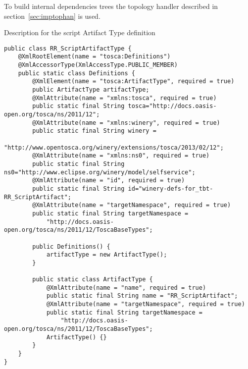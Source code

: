 To build internal dependencies trees the topology handler described in section~\ref{sec:imptophan} is used. 
\begin{Listing} 
	\caption{Description for the script Artifact Type definition}
	\label{lst:scripttype}
\begin{lstlisting}
public class RR_ScriptArtifactType {
	@XmlRootElement(name = "tosca:Definitions")
	@XmlAccessorType(XmlAccessType.PUBLIC_MEMBER)
	public static class Definitions {
		@XmlElement(name = "tosca:ArtifactType", required = true)
		public ArtifactType artifactType;
		@XmlAttribute(name = "xmlns:tosca", required = true)
		public static final String tosca="http://docs.oasis-open.org/tosca/ns/2011/12";
		@XmlAttribute(name = "xmlns:winery", required = true)
		public static final String winery =
			"http://www.opentosca.org/winery/extensions/tosca/2013/02/12";
		@XmlAttribute(name = "xmlns:ns0", required = true)
		public static final String ns0="http://www.eclipse.org/winery/model/selfservice";
		@XmlAttribute(name = "id", required = true)
		public static final String id="winery-defs-for_tbt-RR_ScriptArtifact";
		@XmlAttribute(name = "targetNamespace", required = true)
		public static final String targetNamespace =
			"http://docs.oasis-open.org/tosca/ns/2011/12/ToscaBaseTypes"; 
	
		public Definitions() {
			artifactType = new ArtifactType();
		}
	
		public static class ArtifactType {
			@XmlAttribute(name = "name", required = true)
			public static final String name = "RR_ScriptArtifact";
			@XmlAttribute(name = "targetNamespace", required = true)
			public static final String targetNamespace =
				"http://docs.oasis-open.org/tosca/ns/2011/12/ToscaBaseTypes"; 
			ArtifactType() {}
		}
	}
}
\end{lstlisting}
\end{Listing}
